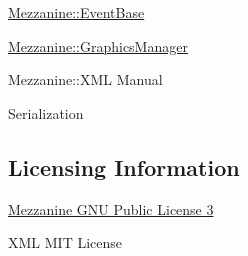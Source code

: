 \hyperlink{classMezzanine_1_1EventBase}{Mezzanine::EventBase}

\hyperlink{classMezzanine_1_1GraphicsManager}{Mezzanine::GraphicsManager}

Mezzanine::XML Manual

Serialization\hypertarget{index_Licensing}{}\subsection{Licensing Information}\label{index_Licensing}
\hyperlink{GPLLicense}{Mezzanine GNU Public License 3}

XML MIT License 